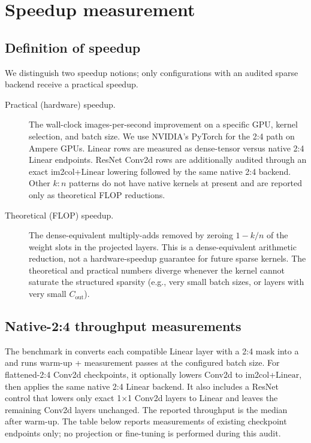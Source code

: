 \documentclass[11pt]{article}
\theoremstyle{plain}
\theoremstyle{definition}
\theoremstyle{remark}
\newcommand{\1}{\mathbf{1}}
\begin{document}
\section{Speedup measurement}
\label{sec:speedup}

\subsection{Definition of speedup}

We distinguish two speedup notions; only configurations with an audited sparse backend receive a practical speedup.

\begin{description}
\item[Practical (hardware) speedup.] The wall-clock images-per-second improvement on a specific GPU, kernel selection, and batch size. We use NVIDIA's PyTorch  for the 2:4 path on Ampere GPUs. Linear rows are measured as dense-tensor versus native 2:4 Linear endpoints. ResNet Conv2d rows are additionally audited through an exact im2col+\(\mathrm{Linear}\) lowering followed by the same native 2:4 backend. Other $k{:}n$ patterns do not have native kernels at present and are reported only as theoretical FLOP reductions.
\item[Theoretical (FLOP) speedup.] The dense-equivalent multiply-adds removed by zeroing $1 - k/n$ of the weight slots in the projected layers. This is a dense-equivalent arithmetic reduction, not a hardware-speedup guarantee for future sparse kernels. The theoretical and practical numbers diverge whenever the kernel cannot saturate the structured sparsity (e.g., very small batch sizes, or layers with very small $C_{\mathrm{out}}$).
\end{description}

\subsection{Native-2:4 throughput measurements}
\label{subsec:a100-bench}

The benchmark in  converts each compatible Linear layer with a 2:4 mask into a  and runs warm-up + measurement passes at the configured batch size. For flattened-2:4 Conv2d checkpoints, it optionally lowers Conv2d to im2col+\(\mathrm{Linear}\), then applies the same native 2:4 Linear backend. It also includes a ResNet control that lowers only exact 1\(\times\)1 Conv2d layers to Linear and leaves the remaining Conv2d layers unchanged. The reported throughput is the median after warm-up. The table below reports measurements of existing checkpoint endpoints only; no projection or fine-tuning is performed during this audit.
\end{document}
